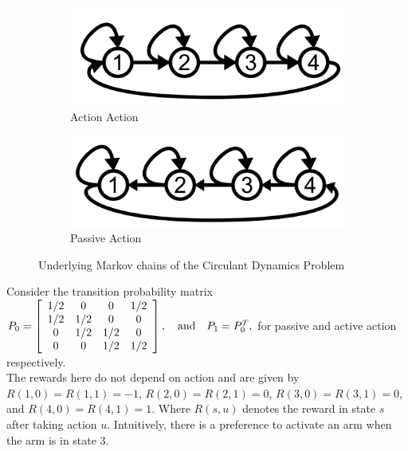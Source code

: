 \documentclass{article}
\theoremstyle{definition}
\begin{document}
\begin{figure}[H]
     \captionsetup[subfigure]{justification=centering}
     \centering
     \begin{subfigure}{0.2\linewidth}
         \centering
         \includegraphics[width=0.7\linewidth]{images/circac.png}
         \caption{Action Action}
         \label{}
     \end{subfigure}
     \begin{subfigure}{0.2\linewidth}
         \centering
         \includegraphics[width=0.7\linewidth]{images/circpas.png}
         \caption{Passive Action}
         \label{}
     \end{subfigure}
     \caption{Underlying Markov chains of the Circulant Dynamics Problem}
     \label{Circulant Dynamics}
\end{figure}
Consider the transition probability matrix $P_0=\left[\begin{array}{cccc}
{\small 1/2} & 0 & 0 & 1/2\\
1/2 & 1/2 & 0 & 0\\
0 & 1/2 & 1/2 & 0\\
0 & 0 & 1/2 & 1/2
\end{array}\right], \quad \mbox{and} \quad
P_1=P_0^T,$ for passive and active action respectively. \\The rewards here do not depend on action and are given by $R(1,0)=R(1,1)=-1$, $R(2,0)=R(2,1)=0$, $R(3,0)=R(3,1)=0$, and $R(4,0)=R(4,1)=1$. Where $R(s,u)$ denotes the reward in state $s$ after taking action $u$.
Intuitively, there is a preference to activate an arm when the arm is in
state 3.\\
\end{document}
